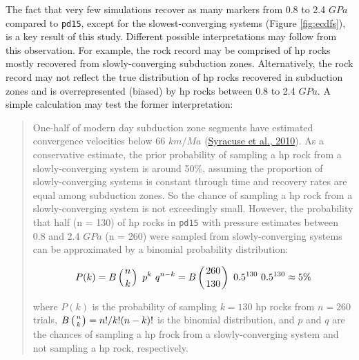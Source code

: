 The fact that very few simulations recover as many markers from 0.8 to 2.4 \(GPa\) compared to \texttt{pd15}, except for the slowest-converging systems (Figure \ref{fig:ecdfs}), is a key result of this study. Different possible interpretations may follow from this observation. For example, the rock record may be comprised of \gls{hp} rocks mostly recovered from slowly-converging subduction zones. Alternatively, the rock record may not reflect the true distribution of \gls{hp} rocks recovered in subduction zones and is overrepresented (biased) by \gls{hp} rocks between 0.8 to 2.4 \(GPa\). A simple calculation may test the former interpretation:

\begin{quote}
One-half of modern day subduction zone segments have estimated convergence velocities below 66 \(km/Ma\) (\protect\hyperlink{ref-syracuse2010}{Syracuse et al., 2010}). As a conservative estimate, the prior probability of sampling a \gls{hp} rock from a slowly-converging system is around 50\%, assuming the proportion of slowly-converging systems is constant through time and recovery rates are equal among subduction zones. So the chance of sampling a \gls{hp} rock from a slowly-converging system is not exceedingly small. However, the probability that half (n = 130) of \gls{hp} rocks in \texttt{pd15} with pressure estimates between 0.8 and 2.4 \(GPa\) (n = 260) were sampled from slowly-converging systems can be approximated by a binomial probability distribution:

\begin{equation}P(k) = B\left(n \atop k \right)\ p^k\ q^{n-k} = B\left(260 \atop 130 \right)\ 0.5^{130}\ 0.5^{130} \approx 5\% \label{eq:binom} \end{equation}

where \(P(k)\) is the probability of sampling \(k=130\) \gls{hp} rocks from \(n=260\) trials, \(B\left( n \atop k \right) = n!/k!(n-k)!\) is the binomial distribution, and \(p\) and \(q\) are the chances of sampling a \gls{hp} frock from a slowly-converging system and not sampling a \gls{hp} rock, respectively.
\end{quote}

